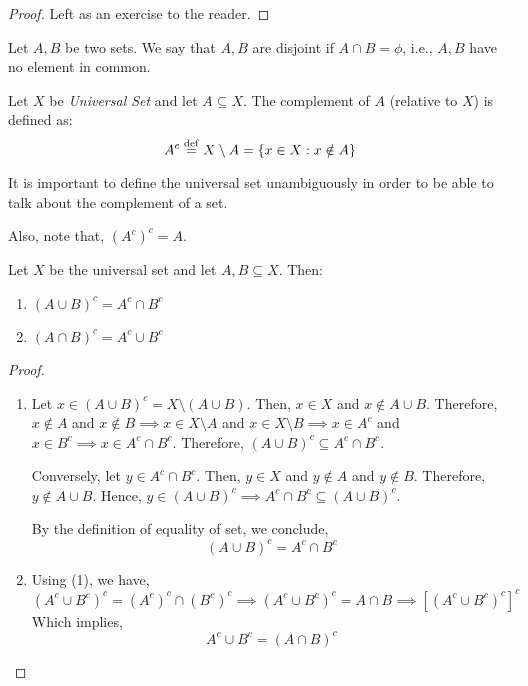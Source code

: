 \documentclass[11pt]{scrartcl}
\begin{document}
    \begin{proof}
        Left as an exercise to the reader.
    \end{proof}
    \begin{definition}
        Let \(A, B\) be two sets. We say that \(A, B\) are disjoint if \(A \cap B = \phi\), i.e., \(A, B\) have no element in common.
    \end{definition}
    \begin{definition}
        Let \(X\) be \emph{Universal Set} and let \(A \subseteq X\). The complement of \(A\) (relative to \(X\)) is defined as: \[A^c \overset{\mathrm{def}}{=} X \setminus A = \{x \in X : x \notin A\}\]
    \end{definition}
    \begin{remark}
        It is important to define the universal set unambiguously in order to be able to talk about the complement of a set.

        Also, note that, \((A^{c})^{c} = A\).
    \end{remark}
    \begin{theorem}
        Let \(X\) be the universal set and let \(A, B \subseteq X\). Then:
        \begin{enumerate}
            \item \((A \cup B)^{c} = A^c \cap B^c\)
            \item \((A \cap B)^c = A^c \cup B^c\)
        \end{enumerate} 
    \end{theorem}
    \begin{proof}
        \begin{enumerate}
            \item Let \(x \in (A \cup B)^c = X \setminus (A \cup B)\). Then, \(x \in X\) and \(x \notin A \cup B\). Therefore, \(x \notin A\) and \(x \notin B \implies x \in X \setminus A\) and \(x \in X \setminus B \implies x \in A^c\) and \(x \in B^c \implies x \in A^c \cap B^c \). Therefore, \((A \cup B)^c \subseteq A^c \cap B^c\).
            
            Conversely, let \(y \in A^c \cap B^c\). Then, \(y \in X\) and \(y \notin A\) and \(y \notin B\). Therefore, \(y \notin A \cup B\). Hence, \(y \in (A \cup B)^c \implies A^c \cap B^c \subseteq (A \cup B)^c\).

            By the definition of equality of set, we conclude, \[(A \cup B)^c = A^c \cap B^c\]
            
            \item Using (1), we have, \((A^c \cup B^c)^c = (A^c)^c \cap (B^c)^c \implies (A^c \cup B^c)^c = A \cap B \implies \left[(A^c \cup B^c)^c\right]^c\) \\ Which implies, \[A^c \cup B^c = (A \cap B)^c\]
        \end{enumerate}
    \end{proof}
\end{document}
